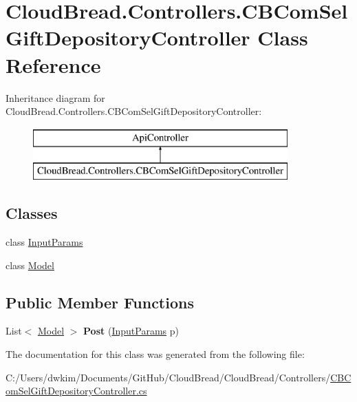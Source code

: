 \hypertarget{a00027}{}\section{Cloud\+Bread.\+Controllers.\+C\+B\+Com\+Sel\+Gift\+Depository\+Controller Class Reference}
\label{a00027}
Inheritance diagram for Cloud\+Bread.\+Controllers.\+C\+B\+Com\+Sel\+Gift\+Depository\+Controller\+:\begin{figure}[H]
\begin{center}
\leavevmode
\includegraphics[height=2.000000cm]{a00027}
\end{center}
\end{figure}
\subsection*{Classes}
\begin{DoxyCompactItemize}
\item 
class \hyperlink{a00114}{Input\+Params}
\item 
class \hyperlink{a00164}{Model}
\end{DoxyCompactItemize}
\subsection*{Public Member Functions}
\begin{DoxyCompactItemize}
\item 
List$<$ \hyperlink{a00164}{Model} $>$ {\bfseries Post} (\hyperlink{a00114}{Input\+Params} p)\hypertarget{a00027_a161c7d4063645ab6509520807b6ee406}{}\label{a00027_a161c7d4063645ab6509520807b6ee406}

\end{DoxyCompactItemize}


The documentation for this class was generated from the following file\+:\begin{DoxyCompactItemize}
\item 
C\+:/\+Users/dwkim/\+Documents/\+Git\+Hub/\+Cloud\+Bread/\+Cloud\+Bread/\+Controllers/\hyperlink{a00200}{C\+B\+Com\+Sel\+Gift\+Depository\+Controller.\+cs}\end{DoxyCompactItemize}
